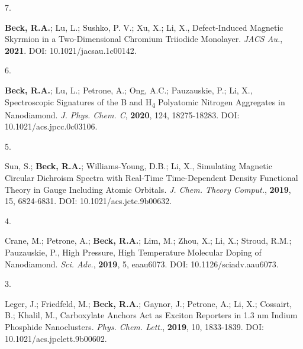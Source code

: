 \begin{cvpublications}



\cvpublication
{7.}
{\parbox[t]{0.95\textwidth}{\strut \textbf{Beck, R.A.}; Lu, L.; Sushko, P. V.; Xu, X.; Li, X.,
Defect-Induced Magnetic Skyrmion in a Two-Dimensional Chromium Triiodide Monolayer.
\textit{JACS Au.}, \textbf{2021}. 
DOI: 10.1021/jacsau.1c00142.}}




\cvpublication
{6.}
{\parbox[t]{0.95\textwidth}{\strut \textbf{Beck, R.A.}; Lu, L.; Petrone, A.; Ong, A.C.; Pauzauskie, P.; Li, X., 
Spectroscopic Signatures of the B and H\textsubscript{4} Polyatomic Nitrogen Aggregates in Nanodiamond.
\textit{J. Phys. Chem. C}, \textbf{2020}, 124, 18275-18283.
DOI: 10.1021/acs.jpcc.0c03106.}}




\cvpublication
{5.}
{\parbox[t]{0.95\textwidth}{\strut Sun, S.; \textbf{Beck, R.A.}; Williams-Young, D.B.; Li, X.,
Simulating Magnetic Circular Dichroism Spectra with Real-Time Time-Dependent Density Functional Theory in Gauge Including Atomic Orbitals.
\textit{J. Chem. Theory Comput.}, \textbf{2019}, 15, 6824-6831.
DOI: 10.1021/acs.jctc.9b00632.}}




\cvpublication
{4.}
{\parbox[t]{0.95\textwidth}{\strut Crane, M.; Petrone, A.; \textbf{Beck, R.A.}; Lim, M.; Zhou, X.; Li, X.; Stroud, R.M.; Pauzauskie, P.,
High Pressure, High Temperature Molecular Doping of Nanodiamond.
\textit{Sci. Adv.}, \textbf{2019}, 5, eaau6073.
DOI: 10.1126/sciadv.aau6073.}}




\cvpublication
{3.}
{\parbox[t]{0.95\textwidth}{\strut Leger, J.; Friedfeld, M.; \textbf{Beck, R.A.}; Gaynor, J.; Petrone, A.; Li, X.; Cossairt, B.; Khalil, M., 
Carboxylate Anchors Act as Exciton Reporters in 1.3 nm Indium Phosphide Nanoclusters.
\textit{Phys. Chem. Lett.}, \textbf{2019}, 10, 1833-1839.
DOI: 10.1021/acs.jpclett.9b00602.}}


\end{cvpublications}
